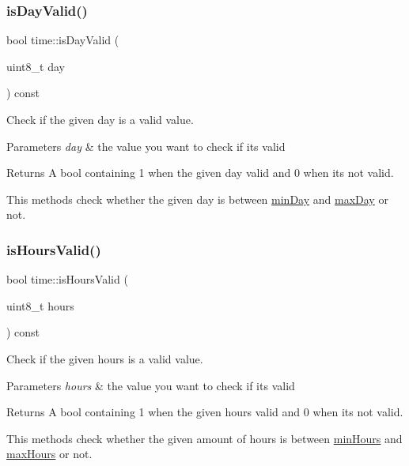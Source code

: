 \subsubsection{\texorpdfstring{is\+Day\+Valid()}{isDayValid()}}
{\footnotesize\ttfamily bool time\+::is\+Day\+Valid (\begin{DoxyParamCaption}\item[{uint8\+\_\+t}]{day }\end{DoxyParamCaption}) const}



Check if the given day is a valid value. 


\begin{DoxyParams}{Parameters}
{\em day} & the value you want to check if it\textquotesingle{}s valid \\
\hline
\end{DoxyParams}
\begin{DoxyReturn}{Returns}
A bool containing 1 when the given day valid and 0 when it\textquotesingle{}s not valid.
\end{DoxyReturn}
This methods check whether the given day is between \mbox{\hyperlink{}{min\+Day}} and \mbox{\hyperlink{}{max\+Day}} or not. \mbox{\label{classtime_afe3fbaa007cbc8072b36c8bd2a556365}} 
\subsubsection{\texorpdfstring{is\+Hours\+Valid()}{isHoursValid()}}
{\footnotesize\ttfamily bool time\+::is\+Hours\+Valid (\begin{DoxyParamCaption}\item[{uint8\+\_\+t}]{hours }\end{DoxyParamCaption}) const}



Check if the given hours is a valid value. 


\begin{DoxyParams}{Parameters}
{\em hours} & the value you want to check if it\textquotesingle{}s valid \\
\hline
\end{DoxyParams}
\begin{DoxyReturn}{Returns}
A bool containing 1 when the given hours valid and 0 when it\textquotesingle{}s not valid.
\end{DoxyReturn}
This methods check whether the given amount of hours is between \mbox{\hyperlink{}{min\+Hours}} and \mbox{\hyperlink{}{max\+Hours}} or not. \mbox{\label{classtime_adafa6fb7a20aee5e865a51576ab9340b}} 
